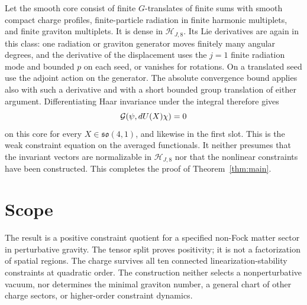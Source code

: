 \documentclass[11pt]{article}
\newcommand{\HH}{\mathcal H}
\numberwithin{equation}{section}
\begin{document}
Let the smooth core consist of finite \(G\)-translates of finite sums
with smooth compact charge profiles, finite-particle radiation in
finite harmonic multiplets, and finite graviton multiplets.
It is dense in \(\HH_{J,8}\).
Its Lie derivatives are again in this class: one radiation or
graviton generator moves finitely many angular degrees, and the
derivative of the displacement uses the \(j=1\) finite radiation
mode and bounded \(p\) on each seed, or vanishes for rotations.
On a translated seed use the adjoint action on the generator.
The absolute convergence bound applies also with such a derivative
and with a short bounded group translation of either argument.
Differentiating Haar invariance under the integral therefore gives
\[
 {\cal G}(\psi,dU(X)\chi)=0
\]
on this core for every \(X\in\mathfrak{so}(4,1)\), and likewise in
the first slot. This is the weak constraint equation on the averaged
functionals. It neither presumes that the invariant vectors are
normalizable in \(\HH_{J,8}\) nor that the nonlinear constraints
have been constructed. This completes the proof of
Theorem~\ref{thm:main}.

\section{Scope}

The result is a positive constraint quotient for a specified
non-Fock matter sector in perturbative gravity. The tensor split
proves positivity; it is not a factorization of spatial regions.
The charge survives all ten connected linearization-stability
constraints at quadratic order. The construction neither selects
a nonperturbative vacuum, nor determines the minimal graviton
number, a general chart of other charge sectors, or higher-order
constraint dynamics.
\end{document}
